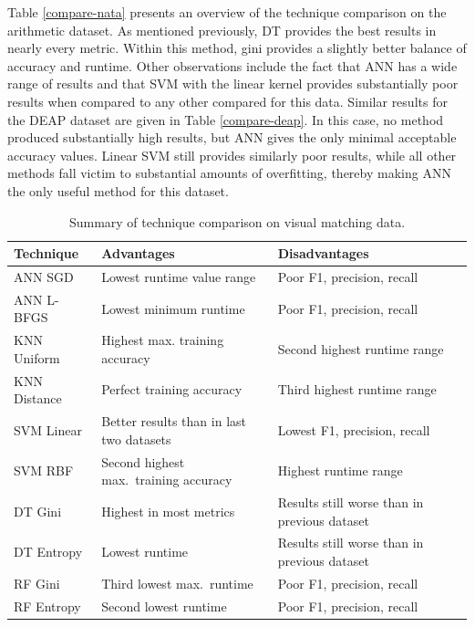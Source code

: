 \documentclass[12pt]{uthesis-v12}  %
\begin{document}
Table \ref{compare-nata} presents an overview of the technique comparison on the arithmetic dataset. As mentioned previously, DT provides the best results in nearly every metric. Within this method, gini provides a slightly better balance of accuracy and runtime. Other observations include the fact that ANN has a wide range of results and that SVM with the linear kernel provides substantially poor results when compared to any other compared for this data. Similar results for the DEAP dataset are given in Table \ref{compare-deap}. In this case, no method produced substantially high results, but ANN gives the only minimal acceptable accuracy values. Linear SVM still provides similarly poor results, while all other methods fall victim to substantial amounts of overfitting, thereby making ANN the only useful method for this dataset.

\begin{table}[!t]
\caption{Summary of technique comparison on visual matching data.}
\renewcommand{\arraystretch}{1.3}
\centering
\resizebox{\textwidth}{!}
{\begin{tabular}{*{3}{l}}
\toprule
Technique & Advantages & Disadvantages \\ \midrule
ANN SGD & Lowest runtime value range & Poor F1, precision, recall \\
ANN L-BFGS & Lowest minimum runtime & Poor F1, precision, recall \\
KNN Uniform & Highest max. training accuracy & Second highest runtime range \\
KNN Distance & Perfect training accuracy & Third highest runtime range \\
SVM Linear & Better results than in last two datasets & Lowest F1, precision, recall \\
SVM RBF & Second highest max.~training accuracy & Highest runtime range \\
DT Gini & Highest in most metrics & Results still worse than in previous dataset \\
DT Entropy & Lowest runtime & Results still worse than in previous dataset \\
RF Gini & Third lowest max.~runtime & Poor F1, precision, recall \\
RF Entropy & Second lowest runtime & Poor F1, precision, recall \\ \bottomrule
\end{tabular}}

\label{compare-vismatch}
\end{table}
\end{document}
